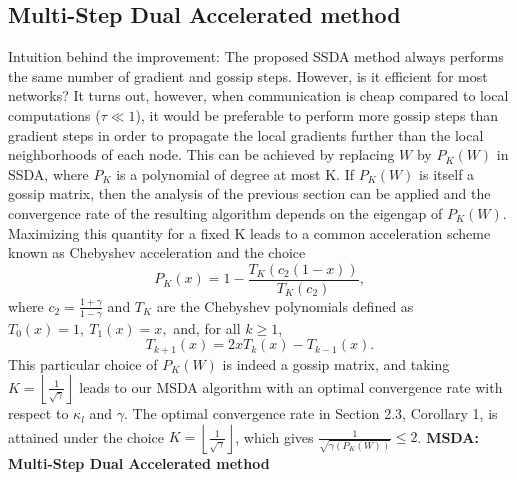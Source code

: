 \documentclass[12pt]{article}
\begin{document}
\subsection{Multi-Step Dual Accelerated method}
Intuition behind the improvement: 
The proposed SSDA method always performs the same number of gradient and gossip steps. However, is it efficient for most networks? 
\newline
\newline
It turns out, however, when communication is cheap compared to local computations 
\newline
($\tau \ll 1$), it would be preferable to perform more gossip steps than gradient steps in order to propagate the local gradients further than the local neighborhoods of each node. 
\newline
\newline
This can be achieved by replacing $W$ by $P_K(W)$ in SSDA, where $P_K$ is a polynomial of degree at most K. If $P_K(W)$ is itself a gossip matrix, then the analysis of the previous section can be applied and the convergence rate of the resulting algorithm depends on the eigengap of $P_K(W)$. Maximizing this quantity for a fixed K leads to a common acceleration scheme known as Chebyshev acceleration and the choice
$$P_{K}(x)=1-\frac{T_{K}\left(c_{2}(1-x)\right)}{T_{K}\left(c_{2}\right)},$$ 
where $c_{2}=\frac{1+\gamma}{1-\gamma}$ and $T_K$ are the Chebyshev polynomials defined as $T_{0}(x)=1,\ T_{1}(x)=x, $ and, for all $k\geq 1$, 
$$T_{k+1}(x)=2 x T_{k}(x)-T_{k-1}(x).$$
This particular choice of $P_K(W)$ is indeed a gossip matrix, and taking $K =
\left\lfloor\frac{1}{\sqrt{\gamma}}\right\rfloor$ leads to our MSDA algorithm with an optimal convergence rate with respect to $\kappa_l$ and $\gamma$. 
\newline
The optimal convergence rate in Section 2.3, Corollary 1, is attained under the choice $K=\left\lfloor\frac{1}{\sqrt{\gamma}}\right\rfloor$, which gives $\frac{1}{\sqrt{\gamma\left(P_{K}(W)\right)}} \leq 2$. 
\newpage
\textbf{MSDA: Multi-Step Dual Accelerated method}
\end{document}
